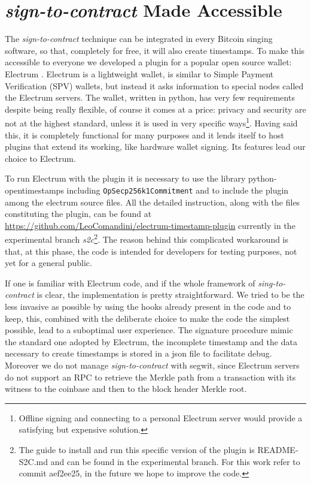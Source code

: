 \section{\textit{sign-to-contract} Made Accessible}
The \textit{sign-to-contract} technique can be integrated in every Bitcoin singing software, so that, completely for free, it will also create timestamps.
To make this accessible to everyone we developed a plugin for a popular open source wallet: Electrum \cite{ElectrumWeb, ElectrumGithub}. 
Electrum is a lightweight wallet, is similar to Simple Payment Verification (SPV) wallets, but instead it asks information to special nodes called the Electrum servers. The wallet, written in python, has very few requirements despite being really flexible, of course it comes at a price: privacy and security are not at the highest standard, unless it is used in very specific ways\footnote{Offline signing and connecting to a personal Electrum server would provide a satisfying but expensive solution.}.
Having said this, it is completely functional for many purposes and it lends itself to host plugins that extend its working, like hardware wallet signing. 
Its features lead our choice to Electrum.

To run Electrum with the plugin it is necessary to use the library python-opentimestamps including \verb|OpSecp256k1Commitment| and to include the plugin among the electrum source files. All the detailed instruction, along with the files constituting the plugin, can be found at \url{https://github.com/LeoComandini/electrum-timestamp-plugin} currently in the experimental branch \textit{s2c}\footnote{The guide to install and run this specific version of the plugin is README-S2C.md and can be found in the experimental branch. For this work refer to commit aef2ee25, in the future we hope to improve the code.}. The reason behind this complicated workaround is that, at this phase, the code is intended for developers for testing purposes, not yet for a general public.

If one is familiar with Electrum code, and if the whole framework of \textit{sing-to-contract} is clear, the implementation is pretty straightforward.  We tried to be the less invasive as possible by using the hooks already present in the code and to keep, this, combined with the deliberate choice to make the code the simplest possible, lead to a suboptimal user experience. 
The signature procedure mimic the standard one adopted by Electrum, the incomplete timestamp and the data necessary to create timestamps is stored in a json file to facilitate debug.
Moreover we do not manage \textit{sign-to-contract} with segwit, since Electrum servers do not support an RPC to retrieve the Merkle path from a transaction with its witness to the coinbase and then to the block header Merkle root.

